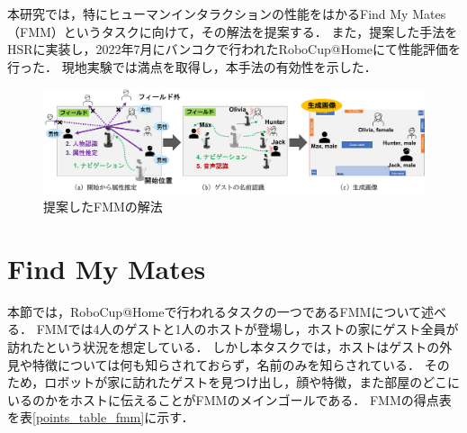 \documentclass[a4j]{jarticle}
\begin{document}
本研究では，特にヒューマンインタラクションの性能をはかるFind My Mates（FMM）というタスクに向けて，その解法を提案する．
また，提案した手法をHSRに実装し，2022年7月にバンコクで行われたRoboCup@Homeにて性能評価を行った．
現地実験では満点を取得し，本手法の有効性を示した．

\begin{figure}[ht]
  \centering
  \includegraphics[width=16cm]{images/FMM/solution_overview_yoko_yy2_cap.png}
  \caption{提案したFMMの解法}
  \label{solution_overview}
\end{figure}



\section{Find My Mates}
本節では，RoboCup@Homeで行われるタスクの一つであるFMMについて述べる．
FMMでは4人のゲストと1人のホストが登場し，ホストの家にゲスト全員が訪れたという状況を想定している．
しかし本タスクでは，ホストはゲストの外見や特徴については何も知らされておらず，名前のみを知らされている．
そのため，ロボットが家に訪れたゲストを見つけ出し，顔や特徴，また部屋のどこにいるのかをホストに伝えることがFMMのメインゴールである．
FMMの得点表を表\ref{points_table_fmm}に示す．
\end{document}

